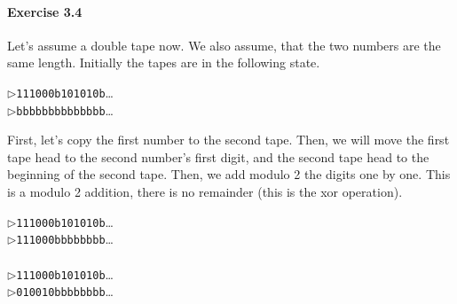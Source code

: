 \documentclass[a4paper,12pt]{article}
\newcommand{\exercise}[1]{\paragraph{Exercise #1}}
\begin{document}
    \exercise{3.4} Let's assume a double tape now. We also assume, that the two numbers are the same length. Initially the tapes are in the following state.
    \begin{center}
        $\triangleright$\texttt{111000b101010b}\ldots\\
        $\triangleright$\texttt{bbbbbbbbbbbbbb}\ldots
    \end{center}
    First, let's copy the first number to the second tape. Then, we will move the first tape head to the second number's first digit, and the second tape head to the beginning of the second tape. Then, we add modulo 2 the digits one by one. This is a modulo 2 addition, there is no remainder (this is the xor operation).
    \begin{center}
        $\triangleright$\texttt{111000b101010b}\ldots\\
        $\triangleright$\texttt{111000bbbbbbbb}\ldots\\
        \ \\
        $\triangleright$\texttt{111000b101010b}\ldots\\
        $\triangleright$\texttt{010010bbbbbbbb}\ldots
    \end{center}
\end{document}
